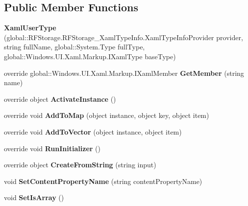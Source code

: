 \subsection*{Public Member Functions}
\begin{DoxyCompactItemize}
\item 
\mbox{\label{class_r_f_storage_1_1_r_f_storage___xaml_type_info_1_1_xaml_user_type_ad7e2164f0d43a2cc89575a33f76500eb}} 
{\bfseries Xaml\+User\+Type} (global\+::\+R\+F\+Storage.\+R\+F\+Storage\+\_\+\+Xaml\+Type\+Info.\+Xaml\+Type\+Info\+Provider provider, string full\+Name, global\+::\+System.\+Type full\+Type, global\+::\+Windows.\+U\+I.\+Xaml.\+Markup.\+I\+Xaml\+Type base\+Type)
\item 
\mbox{\label{class_r_f_storage_1_1_r_f_storage___xaml_type_info_1_1_xaml_user_type_a61367d87091d31711e4e895f09b4a3be}} 
override global\+::\+Windows.\+U\+I.\+Xaml.\+Markup.\+I\+Xaml\+Member {\bfseries Get\+Member} (string name)
\item 
\mbox{\label{class_r_f_storage_1_1_r_f_storage___xaml_type_info_1_1_xaml_user_type_a34b27111c1fe6d60552551ef083b7ca0}} 
override object {\bfseries Activate\+Instance} ()
\item 
\mbox{\label{class_r_f_storage_1_1_r_f_storage___xaml_type_info_1_1_xaml_user_type_ab73ac5a9e59f727397d003f6fecc41b5}} 
override void {\bfseries Add\+To\+Map} (object instance, object key, object item)
\item 
\mbox{\label{class_r_f_storage_1_1_r_f_storage___xaml_type_info_1_1_xaml_user_type_a0944343edec9ca03f9febcb2f2795275}} 
override void {\bfseries Add\+To\+Vector} (object instance, object item)
\item 
\mbox{\label{class_r_f_storage_1_1_r_f_storage___xaml_type_info_1_1_xaml_user_type_aa2fdc38936471ca3f86db788b9e09914}} 
override void {\bfseries Run\+Initializer} ()
\item 
\mbox{\label{class_r_f_storage_1_1_r_f_storage___xaml_type_info_1_1_xaml_user_type_acb39da983c3afac5b3dffdbb4246727a}} 
override object {\bfseries Create\+From\+String} (string input)
\item 
\mbox{\label{class_r_f_storage_1_1_r_f_storage___xaml_type_info_1_1_xaml_user_type_ad2375c85a4d87f6f018c5e289c832050}} 
void {\bfseries Set\+Content\+Property\+Name} (string content\+Property\+Name)
\item 
\mbox{\label{class_r_f_storage_1_1_r_f_storage___xaml_type_info_1_1_xaml_user_type_abad970e9c9099007cd6e741f12ac8963}} 
void {\bfseries Set\+Is\+Array} ()
\item 

\end{DoxyCompactItemize}
